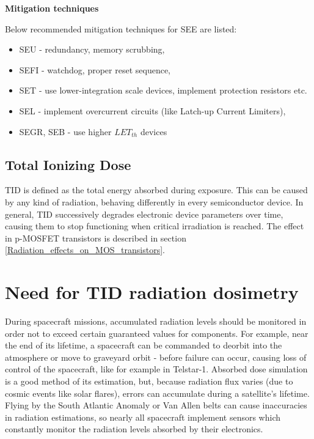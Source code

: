         \bigskip\textbf{Mitigation techniques}

        Below recommended mitigation techniques for SEE are listed:
        \begin{itemize}
            \item SEU - redundancy, memory scrubbing,
            \item SEFI - watchdog, proper reset sequence,
            \item SET - use lower-integration scale devices, implement protection resistors etc.
            \item SEL - implement overcurrent circuits (like Latch-up Current Limiters),
            \item SEGR, SEB - use higher $LET_{th}$ devices
        \end{itemize}

    \subsection{Total Ionizing Dose}
        TID is defined as the total energy absorbed during exposure. This can be caused by any kind of radiation, behaving differently in every semiconductor device. In general, TID successively degrades electronic device parameters over time, causing them to stop functioning when critical irradiation is reached. The effect in p-MOSFET transistors is described in section \ref{Radiation_effects_on_MOS_transistors}.

\section{Need for TID radiation dosimetry}
    During spacecraft missions, accumulated radiation levels should be monitored in order not to exceed certain guaranteed values for components. For example, near the end of its lifetime, a spacecraft can be commanded to deorbit into the atmosphere or move to graveyard orbit - before failure can occur, causing loss of control of the spacecraft, like for example in Telstar-1.
    Absorbed dose simulation is a good method of its estimation, but, because radiation flux varies (due to cosmic events like solar flares), errors can accumulate during a satellite's lifetime. Flying by the South Atlantic Anomaly or Van Allen belts can cause inaccuracies in radiation estimations, so nearly all spacecraft implement sensors which constantly monitor the radiation levels absorbed by their electronics.

